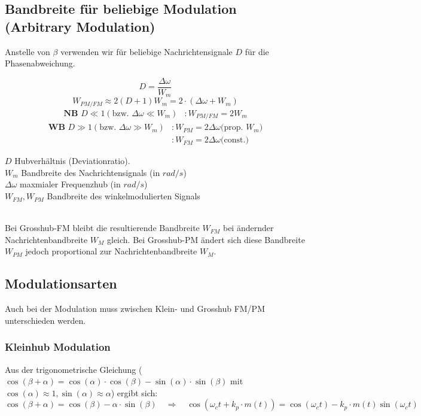 \subsection{Bandbreite für beliebige Modulation (Arbitrary Modulation) }
	Anstelle von $\beta$ verwenden wir für beliebige Nachrichtensignale $D$ für die Phasenabweichung.\\ 
	\begin{minipage}[t][3.2cm][c]{9.5cm}
		$$ D = \frac{\Delta \omega}{W_m} $$	
		\[W_{PM/FM} \approx 2(D + 1) W_m = 2\cdot(\Delta \omega + W_m)\]
		\vspace{-0.7cm}
		\begin{align*}
			\textbf{NB }
			D \ll 1 (\text{bzw. } \Delta \omega \ll W_m)&
			: W_{PM/FM} = 2 W_m
		\end{align*}
		\vspace{-1cm}
		\begin{align*}
			\textbf{WB } 
			D \gg 1 (\text{bzw. } \Delta \omega \gg W_m) &
			: W_{PM} = 2 \Delta \omega \text{(prop. $W_m$)}\\
			& 
			: W_{FM} = 2 \Delta \omega \text{(const.)}
		\end{align*} 

\end{minipage} \hspace{0.6cm}
\begin{minipage}[t][2.7cm][c]{8.5cm} 
	$D$ Hubverh\"altnis (Deviationratio). \\
	$W_m$ Bandbreite des Nachrichtensignals (in $rad/s$)\\
	$\Delta \omega$ maxmialer Frequenzhub (in $rad/s$)\\
	$W_{FM},W_{PM}$ Bandbreite des winkelmodulierten Signals
\end{minipage} \\
Bei Grosshub-FM bleibt die resultierende Bandbreite $W_{FM}$ bei ändernder Nachrichtenbandbreite
$W_M$ gleich. Bei Grosshub-PM ändert sich diese Bandbreite$W_{PM}$ jedoch proportional zur
Nachrichtenbandbreite $W_M$.\\


\subsection{Modulationsarten}
Auch bei der Modulation muss zwischen Klein- und Grosshub FM/PM unterschieden werden.


\subsubsection{Kleinhub Modulation }
Aus der trigonometrische Gleichung ($\cos(\beta + \alpha) = \cos(\alpha) \cdot \cos(\beta) -
\sin(\alpha) \cdot \sin(\beta)$ mit $\cos(\alpha) \approx 1, \sin(\alpha) \approx \alpha$) ergibt
sich: \\
$$\cos(\beta + \alpha) = \cos(\beta) - \alpha \cdot \sin(\beta) \quad \Rightarrow \quad \cos(\omega_c t + k_p \cdot m(t))
= \cos(\omega_c t) - k_p \cdot m(t) \sin(\omega_c t)$$

